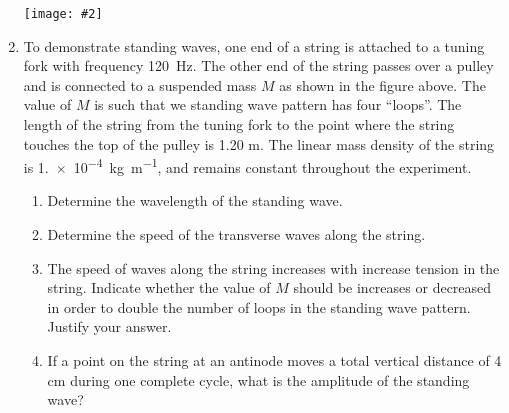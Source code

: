 \documentclass[11pt]{article}
\newcommand{\pic}[2]{
  \begin{center}\texttt{[image: \#2]}\end{center}
}
\begin{document}
\begin{enumerate}
  \pic{.8}{tuning-fork}
\item To demonstrate standing waves, one end of a string is attached to a
  tuning fork with frequency \SI{120}{\hertz}. The other end of the string
  passes over a pulley and is connected to a suspended mass $M$ as shown in the
  figure above. The value of $M$ is such that we standing wave pattern has four
  ``loops''. The length of the string from the tuning fork to the point where
  the string touches the top of the pulley is 1.20 m. The linear mass density
  of the string is \SI{1.e-4}{\kilo\gram\per\metre}, and remains constant
  throughout the experiment.
  \begin{enumerate}
  \item Determine the wavelength of the standing wave.
  \item Determine the speed of the transverse waves along the string.
  \item The speed of waves along the string increases with increase tension in
    the string. Indicate whether the value of $M$ should be increases or
    decreased in order to double the number of loops in the standing wave
    pattern. Justify your answer.
  \item If a point on the string at an antinode moves a total vertical distance
    of 4 cm during one complete cycle, what is the amplitude of the standing
    wave?
  \end{enumerate}
\end{enumerate}
\end{document}
